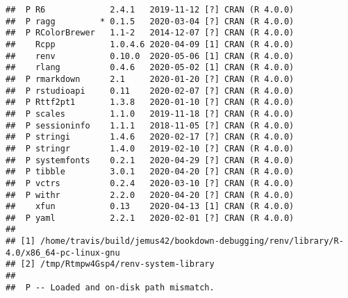 \documentclass[ngerman,a4paper,]{scrartcl}
\begin{document}
\begin{verbatim}
##  P R6             2.4.1   2019-11-12 [?] CRAN (R 4.0.0)              
##  P ragg         * 0.1.5   2020-03-04 [?] CRAN (R 4.0.0)              
##  P RColorBrewer   1.1-2   2014-12-07 [?] CRAN (R 4.0.0)              
##    Rcpp           1.0.4.6 2020-04-09 [1] CRAN (R 4.0.0)              
##    renv           0.10.0  2020-05-06 [1] CRAN (R 4.0.0)              
##    rlang          0.4.6   2020-05-02 [1] CRAN (R 4.0.0)              
##  P rmarkdown      2.1     2020-01-20 [?] CRAN (R 4.0.0)              
##  P rstudioapi     0.11    2020-02-07 [?] CRAN (R 4.0.0)              
##  P Rttf2pt1       1.3.8   2020-01-10 [?] CRAN (R 4.0.0)              
##  P scales         1.1.0   2019-11-18 [?] CRAN (R 4.0.0)              
##  P sessioninfo    1.1.1   2018-11-05 [?] CRAN (R 4.0.0)              
##  P stringi        1.4.6   2020-02-17 [?] CRAN (R 4.0.0)              
##  P stringr        1.4.0   2019-02-10 [?] CRAN (R 4.0.0)              
##  P systemfonts    0.2.1   2020-04-29 [?] CRAN (R 4.0.0)              
##  P tibble         3.0.1   2020-04-20 [?] CRAN (R 4.0.0)              
##  P vctrs          0.2.4   2020-03-10 [?] CRAN (R 4.0.0)              
##  P withr          2.2.0   2020-04-20 [?] CRAN (R 4.0.0)              
##    xfun           0.13    2020-04-13 [1] CRAN (R 4.0.0)              
##  P yaml           2.2.1   2020-02-01 [?] CRAN (R 4.0.0)              
## 
## [1] /home/travis/build/jemus42/bookdown-debugging/renv/library/R-4.0/x86_64-pc-linux-gnu
## [2] /tmp/Rtmpw4Gsp4/renv-system-library
## 
##  P -- Loaded and on-disk path mismatch.
\end{verbatim}


\end{document}
